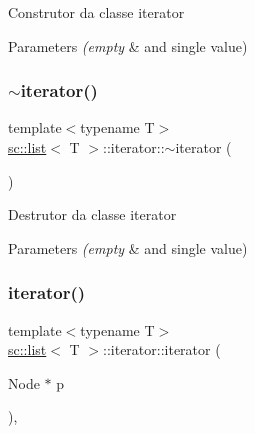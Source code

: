 Construtor da classe iterator 
\begin{DoxyParams}{Parameters}
{\em (empty} & and single value) \\
\hline
\end{DoxyParams}
\mbox{\label{classsc_1_1list_1_1iterator_a84674835b45ab08a280df0c6a474b57a}} 
\subsubsection{\texorpdfstring{$\sim$iterator()}{~iterator()}}
{\footnotesize\ttfamily template$<$typename T$>$ \\
\mbox{\hyperlink{classsc_1_1list}{sc\+::list}}$<$ T $>$\+::iterator\+::$\sim$iterator (\begin{DoxyParamCaption}{ }\end{DoxyParamCaption})\hspace{0.3cm}{\ttfamily [default]}}

Destrutor da classe iterator 
\begin{DoxyParams}{Parameters}
{\em (empty} & and single value) \\
\hline
\end{DoxyParams}
\mbox{\label{classsc_1_1list_1_1iterator_a818795d7651516a93e563f3229e86351}} 
\subsubsection{\texorpdfstring{iterator()}{iterator()}\hspace{0.1cm}{\footnotesize\ttfamily [2/2]}}
{\footnotesize\ttfamily template$<$typename T$>$ \\
\mbox{\hyperlink{classsc_1_1list}{sc\+::list}}$<$ T $>$\+::iterator\+::iterator (\begin{DoxyParamCaption}\item[{Node $\ast$}]{p }\end{DoxyParamCaption})\hspace{0.3cm}{\ttfamily [inline]}, {\ttfamily [protected]}}



